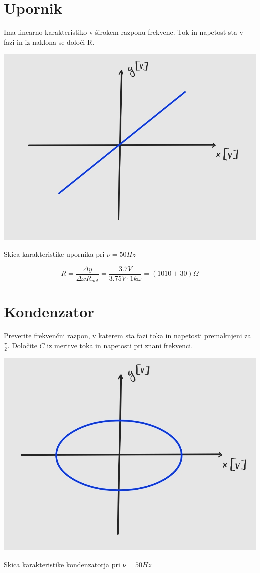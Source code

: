 \documentclass[12pt]{report}
\begin{document}
\section*{Upornik}

Ima linearno karakteristiko v širokem razponu frekvenc. Tok in napetost sta v fazi in iz naklona se določi R. 

\begin{slika}[H]
  \centering
  \includegraphics{upornik}
  \caption{\small Skica karakteristike upornika pri $\nu = 50\si{Hz}$}
\end{slika}

\[
  R = \frac{\Delta y}{\Delta x R_{not}} = \frac{3.7\si{V}}{3.75\si{V} \cdot 1k\omega} = (1010 \pm 30) \Omega
\]

\section*{Kondenzator}

Preverite frekvenčni razpon, v katerem sta fazi toka in napetosti premaknjeni za $\frac{\pi}{2}$. Določite $C$ iz meritve toka in napetosti pri znani frekvenci. 

\begin{slika}[H]
  \centering
  \includegraphics{kondenzator}
  \caption{\small Skica karakteristike kondenzatorja pri $\nu = 50\si{Hz}$}
\end{slika}
\end{document}
